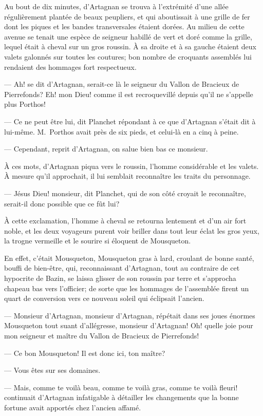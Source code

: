 Au bout de dix minutes, d'Artagnan se trouva à l'extrémité d'une allée régulièrement plantée de beaux peupliers, et qui aboutissait à une grille de fer dont les piques et les bandes transversales étaient dorées. Au milieu de cette avenue se tenait une espèce de seigneur habillé de vert et doré comme la grille, lequel était à cheval sur un gros roussin. À sa droite et à sa gauche étaient deux valets galonnés sur toutes les coutures; bon nombre de croquants assemblés lui rendaient des hommages fort respectueux.

— Ah! se dit d'Artagnan, serait-ce là le seigneur du Vallon de Bracieux de Pierrefonds? Eh! mon Dieu! comme il est recroquevillé depuis qu'il ne s'appelle plus Porthos!

— Ce ne peut être lui, dit Planchet répondant à ce que d'Artagnan s'était dit à lui-même. M.~Porthos avait près de six pieds, et celui-là en a cinq à peine.

— Cependant, reprit d'Artagnan, on salue bien bas ce monsieur.

À ces mots, d'Artagnan piqua vers le roussin, l'homme considérable et les valets. À mesure qu'il approchait, il lui semblait reconnaître les traits du personnage.

— Jésus Dieu! monsieur, dit Planchet, qui de son côté croyait le reconnaître, serait-il donc possible que ce fût lui?

À cette exclamation, l'homme à cheval se retourna lentement et d'un air fort noble, et les deux voyageurs purent voir briller dans tout leur éclat les gros yeux, la trogne vermeille et le sourire si éloquent de Mousqueton.

En effet, c'était Mousqueton, Mousqueton gras à lard, croulant de bonne santé, bouffi de bien-être, qui, reconnaissant d'Artagnan, tout au contraire de cet hypocrite de Bazin, se laissa glisser de son roussin par terre et s'approcha chapeau bas vers l'officier; de sorte que les hommages de l'assemblée firent un quart de conversion vers ce nouveau soleil qui éclipsait l'ancien.

— Monsieur d'Artagnan, monsieur d'Artagnan, répétait dans ses joues énormes Mousqueton tout suant d'allégresse, monsieur d'Artagnan! Oh! quelle joie pour mon seigneur et maître du Vallon de Bracieux de Pierrefonds!

— Ce bon Mousqueton! Il est donc ici, ton maître?

— Vous êtes sur ses domaines.

— Mais, comme te voilà beau, comme te voilà gras, comme te voilà fleuri! continuait d'Artagnan infatigable à détailler les changements que la bonne fortune avait apportés chez l'ancien affamé.

